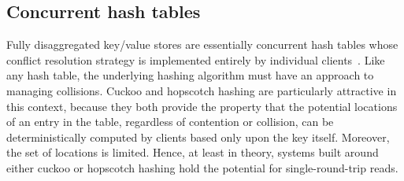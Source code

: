





\subsection{Concurrent hash tables} 
\label{sec:cuckoo-back}

Fully disaggregated key/value stores are essentially concurrent hash
tables whose conflict resolution strategy is implemented entirely by
individual clients~\cite{rolex,fusee,race}.  Like any hash table, the
underlying hashing algorithm must have an approach to managing
collisions. Cuckoo and hopscotch hashing are particularly attractive
in this context, because they both provide the property that the
potential locations of an entry in the table, regardless of
contention or collision, can be deterministically computed by clients
based only upon the key itself.  Moreover, the set of locations is
limited.  Hence, at least in theory, systems built around either
cuckoo or hopscotch hashing hold the potential for single-round-trip
reads.

